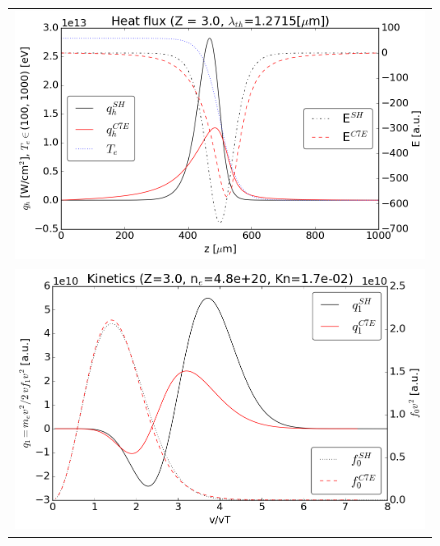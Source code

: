 \documentclass[preprint,12pt]{elsarticle}
\begin{document}
\begin{figure}[tbh]
  \begin{center}
    \begin{tabular}{c}
      \includegraphics[width=1.0\textwidth]{../results/fe_analysis/C7E/P5_heatflux_Z3_halfF.png} \\ 
      \includegraphics[width=1.0\textwidth]{../results/fe_analysis/C7E/P5_kinetics_Z3_halfF.png}
    \end{tabular}
  \caption{
  }
  \end{center}
  \label{fig:AWBScorrection_f1}
\end{figure}
\end{document}
